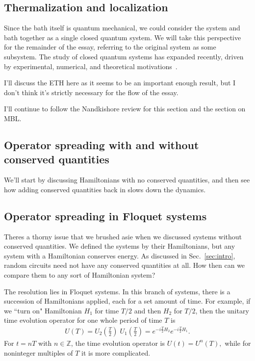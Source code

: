 \documentclass[a4paper,12pt]{article}
\newcommand{\note}[1]{{\color{red}{#1}}}
\begin{document}
\subsection{Thermalization and localization} \label{sub:therm}

Since the bath itself is quantum mechanical, we could consider the system and bath together as a single closed quantum system. We will take this perspective for the remainder of the essay, referring to the original system as some subsystem. The study of closed quantum systems has expanded recently, driven by experimental, numerical, and theoretical motivations~\cite{GogolinStatMech}.

I'll discuss the ETH here as it seems to be an important enough result, but I don't think it's strictly necessary for the flow of the essay.

I'll continue to follow the Nandkishore review for this section and the section on MBL.

\subsection{Operator spreading with and without conserved quantities} \label{sub:opsp}

We'll start by discussing Hamiltonians with no conserved quantities, and then see how adding conserved quantities back in slows down the dynamics. \note{Will we get to localization in this section?}



\subsection{Operator spreading in Floquet systems} \label{sub:floq}

Theres a thorny issue that we brushed asie when we discussed systems without conserved quantities. We defined the systems by their Hamiltonians, but any system with a Hamiltonian conserves energy. As discussed in Sec.~\ref{sec:intro}, random circuits need not have any conserved quantities at all. How then can we compare them to any sort of Hamiltonian system?

The resolution lies in Floquet systems. In this branch of systems, there is a succession of Hamiltonians applied, each for a set amount of time. For example, if we ``turn on" Hamiltonian $H_1$ for time $T/2$ and then $H_2$ for $T/2$, then the unitary time evolution operator for one whole period of time $T$ is 
\begin{align}
U(T) = U_2\left(\frac{T}{2}\right)\; U_1\left(\frac{T}{2}\right) = e^{-i\frac{T}{2}H_2} e^{-i\frac{T}{2}H_1}.
\end{align}
For $t=nT$ with $n\in \mathbb{Z}$, the time evolution operator is $U(t)=U^n(T),$ while for noninteger multiples of $T$ it is more complicated. 
\end{document}
